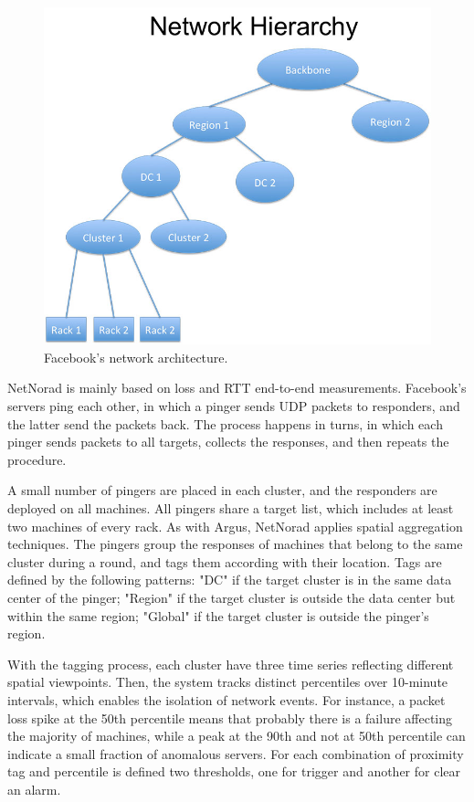 \begin{figure}[H]
    \centering
    \includegraphics[width=1.0\textwidth]{./figures/literature_review/netnorad_network_architecture.jpg}
    \caption{Facebook's network architecture.}
    \label{fig:netnorad_network_architecture}
\end{figure}%

NetNorad is mainly based on loss and RTT end-to-end measurements.
Facebook's servers ping each other, in which
a pinger sends UDP packets to responders, and the latter
send the packets back. The process happens in turns, in which each pinger
sends packets to all targets, collects the responses, and then repeats
the procedure.

A small number of pingers are placed in each cluster, and the responders are
deployed on all machines. All pingers share a target list, which includes
at least two machines of every rack.
As with Argus, NetNorad applies spatial aggregation techniques.
The pingers group the responses of machines that belong to the same cluster
during a round, and tags them according with their location.
Tags are defined by the following patterns:
"DC" if the target cluster is in the same data center of the pinger;
"Region" if the target cluster is outside the
data center but within the same region;
"Global" if the target cluster is outside the pinger's
region.

With the tagging process, each cluster have three time series reflecting
different spatial viewpoints. Then, the system tracks
distinct percentiles over 10-minute
intervals, which enables the isolation of
network events. For instance, a packet loss spike at the
50th percentile means that probably there is a failure affecting the majority of
machines, while a peak at the 90th and not at 50th
percentile can indicate a small fraction of anomalous servers.
For each combination of proximity tag and percentile is defined two
thresholds, one for trigger and another for clear an alarm.

